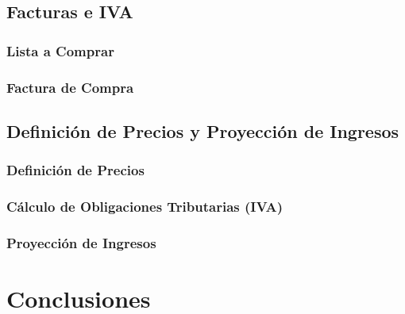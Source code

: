 \documentclass[12pt]{article}
\begin{document}
    \subsection{Facturas e IVA} %
        \subsubsection{Lista a Comprar}
        \subsubsection{Factura de Compra}


    \subsection{Definición de Precios y Proyección de Ingresos}
        \subsubsection{Definición de Precios}
        \subsubsection{Cálculo de Obligaciones Tributarias (IVA)}
        \subsubsection{Proyección de Ingresos}
        
    \newpage


\section{Conclusiones} %
\end{document}

